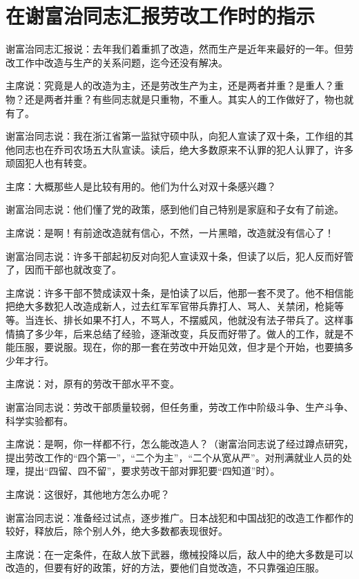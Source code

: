 \section[在谢富治同志汇报劳改工作时的指示（一九六四年四月二十八日）]{在谢富治同志汇报劳改工作时的指示}


谢富治同志汇报说：去年我们着重抓了改造，然而生产是近年来最好的一年。但劳改工作中改造与生产的关系问题，迄今还没有解决。

主席说：究竟是人的改造为主，还是劳改生产为主，还是两者并重？是重人？重物？还是两者并重？有些同志就是只重物，不重人。其实人的工作做好了，物也就有了。

谢富治同志说：我在浙江省第一监狱守硕中队，向犯人宣读了双十条，工作组的其他同志也在乔司农场五大队宣读。读后，绝大多数原来不认罪的犯人认罪了，许多顽固犯人也有转变。

主席：大概那些人是比较有用的。他们为什么对双十条感兴趣？

谢富治同志说：他们懂了党的政策，感到他们自己特别是家庭和子女有了前途。

主席说：是啊！有前途改造就有信心，不然，一片黑暗，改造就没有信心了！

谢富治同志说：许多干部起初反对向犯人宣读双十条，但读了以后，犯人反而好管了，因而干部也就改变了。

主席说：许多干部不赞成读双十条，是怕读了以后，他那一套不灵了。他不相信能把绝大多数犯人改造成新人，过去红军军官带兵靠打人、骂人、关禁闭，枪毙等等。当连长、排长如果不打人，不骂人，不摆威风，他就没有法子带兵了。这样事情搞了多少年，后来总结了经验，逐渐改变，兵反而好带了。做人的工作，就是不能压服，要说服。现在，你的那一套在劳改中开始见效，但才是个开始，也要搞多少年才行。

主席说：对，原有的劳改干部水平不变。

谢富治同志说：劳改干部质量较弱，但任务重，劳改工作中阶级斗争、生产斗争、科学实验都有。

主席说：是啊，你一样都不行，怎么能改造人？（谢富治同志说了经过蹲点研究，提出劳改工作的“四个第一”，“二个为主”，“二个从宽从严”。对刑满就业人员的处理，提出“四留、四不留”，要求劳改干部对罪犯要“四知道”时）。

主席说：这很好，其他地方怎么办呢？

谢富治同志说：准备经过试点，逐步推广。日本战犯和中国战犯的改造工作都作的较好，释放后，除个别人外，绝大多数都表现很好。

主席说：在一定条件，在敌人放下武器，缴械投降以后，敌人中的绝大多数是可以改造的，但要有好的政策，好的方法，要他们自觉改造，不只靠强迫压服。



